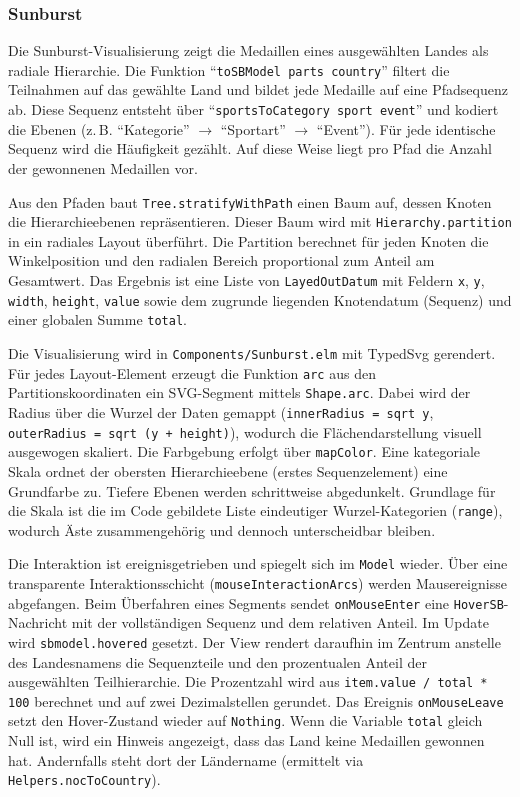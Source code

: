 \subsubsection{Sunburst}

Die Sunburst-Visualisierung zeigt die Medaillen eines ausgewählten Landes als radiale Hierarchie. Die Funktion \enquote{\texttt{toSBModel parts country}} filtert die Teilnahmen auf das gewählte Land und bildet jede Medaille auf eine Pfadsequenz ab. Diese Sequenz entsteht über \enquote{\texttt{sportsToCategory sport event}} und kodiert die Ebenen (z.\,B. \enquote{Kategorie} \(\rightarrow\) \enquote{Sportart} \(\rightarrow\) \enquote{Event}). Für jede identische Sequenz wird die Häufigkeit gezählt. Auf diese Weise liegt pro Pfad die Anzahl der gewonnenen Medaillen vor.

Aus den Pfaden baut \texttt{Tree.stratifyWithPath} einen Baum auf, dessen Knoten die Hierarchieebenen repräsentieren. Dieser Baum wird mit \texttt{Hierarchy.partition} in ein radiales Layout überführt. Die Partition berechnet für jeden Knoten die Winkelposition und den radialen Bereich proportional zum Anteil am Gesamtwert. Das Ergebnis ist eine Liste von \texttt{LayedOutDatum} mit Feldern \texttt{x}, \texttt{y}, \texttt{width}, \texttt{height}, \texttt{value} sowie dem zugrunde liegenden Knotendatum (Sequenz) und einer globalen Summe \texttt{total}.

Die Visualisierung wird in \texttt{Components/Sunburst.elm} mit TypedSvg gerendert. Für jedes Layout-Element erzeugt die Funktion \texttt{arc} aus den Partitionskoordinaten ein SVG-Segment mittels \texttt{Shape.arc}. Dabei wird der Radius über die Wurzel der Daten gemappt (\texttt{innerRadius = sqrt y}, \texttt{outerRadius = sqrt (y + height)}), wodurch die Flächendarstellung visuell ausgewogen skaliert. Die Farbgebung erfolgt über \texttt{mapColor}. Eine kategoriale Skala ordnet der obersten Hierarchieebene (erstes Sequenzelement) eine Grundfarbe zu. Tiefere Ebenen werden schrittweise abgedunkelt. Grundlage für die Skala ist die im Code gebildete Liste eindeutiger Wurzel-Kategorien (\texttt{range}), wodurch Äste zusammengehörig und dennoch unterscheidbar bleiben.

Die Interaktion ist ereignisgetrieben und spiegelt sich im \texttt{Model} wieder. Über eine transparente Interaktionsschicht (\texttt{mouseInteractionArcs}) werden Mausereignisse abgefangen. Beim Überfahren eines Segments sendet \texttt{onMouseEnter} eine \texttt{HoverSB}-Nachricht mit der vollständigen Sequenz und dem relativen Anteil. Im Update wird \texttt{sbmodel.hovered} gesetzt. Der View rendert daraufhin im Zentrum anstelle des Landesnamens die Sequenzteile und den prozentualen Anteil der ausgewählten Teilhierarchie. Die Prozentzahl wird aus \texttt{item.value / total * 100} berechnet und auf zwei Dezimalstellen gerundet. Das Ereignis \texttt{onMouseLeave} setzt den Hover-Zustand wieder auf \texttt{Nothing}. Wenn die Variable \texttt{total} gleich Null ist, wird ein Hinweis angezeigt, dass das Land keine Medaillen gewonnen hat. Andernfalls steht dort der Ländername (ermittelt via \texttt{Helpers.nocToCountry}).


